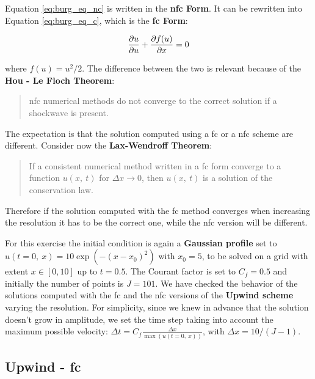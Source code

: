 \documentclass[11pt, a4paper]{article}
\begin{document}
Equation \ref{eq:burg_eq_nc} is written in the
\textbf{\acrfull{nfc} Form}. It can be rewritten into Equation
\ref{eq:burg_eq_c}, which is the \textbf{\acrfull{fc} Form}:

\begin{equation} \label{eq:burg_eq_c}
    \pdv{u}{u} + \pdv{f(u)}{x} = 0
\end{equation}

\noindent
where \(f(u) = u^2 / 2\). The difference between the two is relevant because
of the \textbf{Hou - Le Floch Theorem}:

\begin{quote}
    \acrlong{nfc} numerical methods do not converge to the correct
    solution if a shockwave is present.
\end{quote}

\noindent
The expectation is that the solution computed using a \acrshort{fc} or a
\acrshort{nfc} scheme are different. Consider now the
\textbf{Lax-Wendroff Theorem}:

\begin{quote}
    If a consistent numerical method written in a \acrshort{fc} form
    converge to a function \(u(x,\ t)\) for \(\Delta x \to 0\), then
    \(u(x,\ t)\) is a solution of the conservation law.
\end{quote}

\noindent
Therefore if the solution computed with the \acrshort{fc} method converges when
increasing the resolution it has to be the correct one, while the
\acrshort{nfc} version will be different.

For this exercise the initial condition is again a \textbf{Gaussian profile}
set to \(u(t = 0,\ x) = 10 \exp(-(x - x_0)^2)\) with \(x_0 = 5\), to be
solved on a grid with extent \(x \in [0, 10]\) up to \(t = 0.5\).
The Courant factor is set to \(C_f = 0.5\) and initially the number of points
is \(J = 101\). We have checked the behavior of the solutions computed with the
\acrshort{fc} and the \acrshort{nfc} versions of the \textbf{Upwind scheme}
varying the resolution. For simplicity, since we knew in advance that the
solution doesn't grow in amplitude, we set the time step taking into account
the maximum possible velocity:
\(\Delta t = C_f \frac{\Delta x}{\max(u(t = 0,\ x))}\), with
\(\Delta x = 10 / (J - 1)\).

\subsection{Upwind - \acrlong{fc}}
\end{document}

